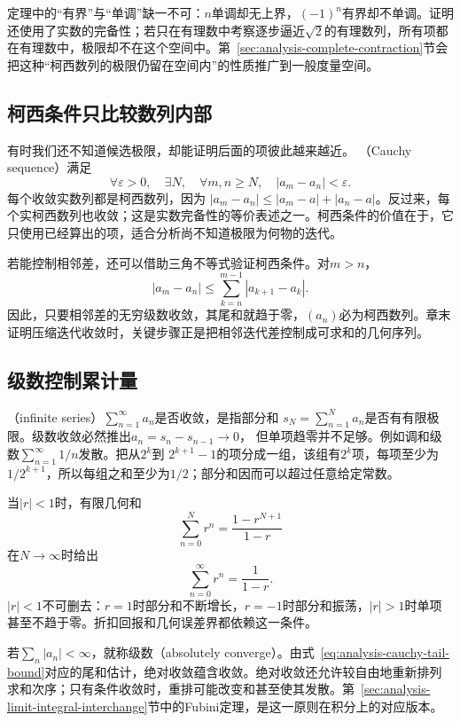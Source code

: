 定理中的“有界”与“单调”缺一不可：$n$单调却无上界，$(-1)^n$有界却不单调。证明还使用了实数的完备性；若只在有理数中考察逐步逼近$\sqrt{2}$的有理数列，所有项都在有理数中，极限却不在这个空间中。第~\ref{sec:analysis-complete-contraction}节会把这种“柯西数列的极限仍留在空间内”的性质推广到一般度量空间。
\subsection{柯西条件只比较数列内部}

有时我们还不知道候选极限，却能证明后面的项彼此越来越近。
（Cauchy sequence）满足
\[   \forall\varepsilon>0,\quad   \exists N,\quad   \forall m,n\geq N,\quad |a_m-a_n|<\varepsilon. \]
每个收敛实数列都是柯西数列，因为 $|a_m-a_n|\leq|a_m-a|+|a_n-a|$。反过来，每个实柯西数列也收敛；这是实数完备性的等价表述之一。柯西条件的价值在于，它只使用已经算出的项，适合分析尚不知道极限为何物的迭代。

若能控制相邻差，还可以借助三角不等式验证柯西条件。对$m>n$，
\begin{equation}
  |a_m-a_n|
  \leq
  \sum_{k=n}^{m-1}|a_{k+1}-a_k|.
\label{eq:analysis-cauchy-tail-bound}
\end{equation}
因此，只要相邻差的无穷级数收敛，其尾和就趋于零，$(a_n)$必为柯西数列。章末证明压缩迭代收敛时，关键步骤正是把相邻迭代差控制成可求和的几何序列。
\subsection{级数控制累计量}

（infinite series）$\sum_{n=1}^{\infty}a_n$是否收敛，是指部分和 $s_N=\sum_{n=1}^{N}a_n$是否有有限极限。级数收敛必然推出$a_n=s_n-s_{n-1}\to0$， 但单项趋零并不足够。例如调和级数$\sum_{n=1}^{\infty}1/n$发散。把从$2^k$到 $2^{k+1}-1$的项分成一组，该组有$2^k$项，每项至少为$1/2^{k+1}$，所以每组之和至少为$1/2$；部分和因而可以超过任意给定常数。

当$|r|<1$时，有限几何和
\[   \sum_{n=0}^{N}r^n=\frac{1-r^{N+1}}{1-r} \]
在$N\to\infty$时给出
\begin{equation}
  \sum_{n=0}^{\infty}r^n=\frac{1}{1-r}.
\label{eq:analysis-geometric-series}
\end{equation}
$|r|<1$不可删去：$r=1$时部分和不断增长，$r=-1$时部分和振荡，$|r|>1$时单项甚至不趋于零。折扣回报和几何误差界都依赖这一条件。

若$\sum_n|a_n|<\infty$，就称级数（absolutely converge）。由式~\eqref{eq:analysis-cauchy-tail-bound}对应的尾和估计，绝对收敛蕴含收敛。绝对收敛还允许较自由地重新排列求和次序；只有条件收敛时，重排可能改变和甚至使其发散。第~\ref{sec:analysis-limit-integral-interchange}节中的Fubini定理，是这一原则在积分上的对应版本。
